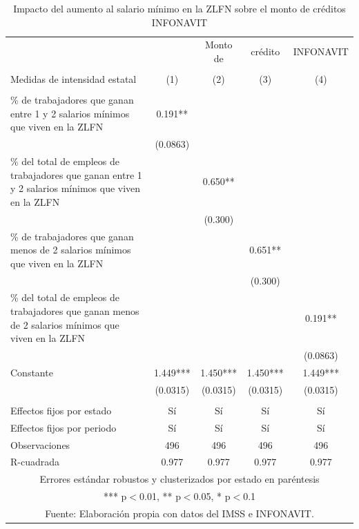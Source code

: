 \begin{table}[H]
\caption{Impacto del aumento al salario mínimo en la ZLFN sobre el monto de créditos INFONAVIT}
\label{tab:3}
\begin{adjustbox}{max width=\textwidth}
\begin{tabular}{lcccc}
 &  &  &  &  \\
\hline
 & & Monto de & crédito & INFONAVIT  \\
 &  &  &  &  \\
Medidas de intensidad estatal & (1) & (2) & (3) & (4)  \\ \hline
 &  &  &  &  \\
\% de trabajadores que ganan entre 1 y 2 salarios mínimos que viven en la ZLFN & 0.191** &  &  &  \\
 & (0.0863) &  &  &  \\
 \% del total de empleos de trabajadores que ganan entre 1 y 2 salarios mínimos que viven en la ZLFN &  & 0.650** &  &  \\
 &  & (0.300) &  &  \\
\% de trabajadores que ganan menos de 2 salarios mínimos que viven en la ZLFN &  &  & 0.651** &  \\
 &  &  & (0.300) &  \\
\% del total de empleos de trabajadores que ganan menos de 2 salarios mínimos que viven en la ZLFN  &  &  &  & 0.191** \\
 &  &  &  & (0.0863) \\
Constante & 1.449*** & 1.450*** & 1.450*** & 1.449*** \\
 & (0.0315) & (0.0315) & (0.0315) & (0.0315) \\
 &  &  &  &  \\
 Effectos fijos por estado  &  Sí &  Sí &  Sí & Sí \\
  Effectos fijos por periodo  &  Sí &  Sí &  Sí & Sí \\
Observaciones & 496 & 496 & 496 & 496 \\
 R-cuadrada & 0.977 & 0.977 & 0.977 & 0.977 \\ \hline
\multicolumn{5}{c}{ Errores estándar robustos y clusterizados por estado en paréntesis} \\
\multicolumn{5}{c}{ *** p$<$0.01, ** p$<$0.05, * p$<$0.1} \\
\multicolumn{5}{c}{Fuente: Elaboración propia con datos del IMSS e INFONAVIT.} \\
\end{tabular}

\end{adjustbox}
\end{table}

